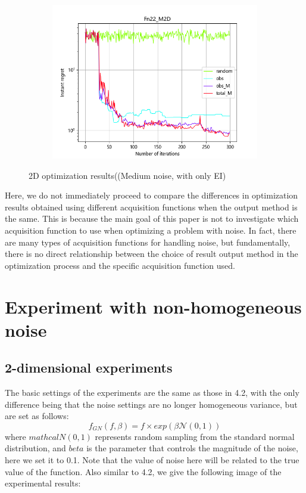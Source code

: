 \documentclass{article}
\begin{document}
\begin{figure}[H]
\begin{subfigure}[t]{.32\linewidth}
        \includegraphics[width=1\textwidth]{pictures/Homo_noise_2D_onlyEI/Fn22_M2D_ins.png}
    \end{subfigure}
    \caption{2D optimization results((Medium noise, with only EI)}
    \label{Fig9}
\end{figure}

\hspace{2em}Here, we do not immediately proceed to compare the differences in optimization results obtained using different acquisition functions when the output method is the same. This is because the main goal of this paper is not to investigate which acquisition function to use when optimizing a problem with noise. In fact, there are many types of acquisition functions for handling noise, but fundamentally, there is no direct relationship between the choice of result output method in the optimization process and the specific acquisition function used.

\section{Experiment with non-homogeneous noise}
\subsection{2-dimensional experiments}
The basic settings of the experiments are the same as those in 4.2, with the only difference being that the noise settings are no longer homogeneous variance, but are set as follows:
\begin{equation}\label{eq12}
	f_{GN}(f,\beta) = f \times exp(\beta\mathcal{N}(0,1)) 
\end{equation}
where $mathcal{N}(0,1)$ represents random sampling from the standard normal distribution, and $beta$ is the parameter that controls the magnitude of the noise, here we set it to 0.1. Note that the value of noise here will be related to the true value of the function. Also similar to 4.2, we give the following image of the experimental results:
\end{document}
